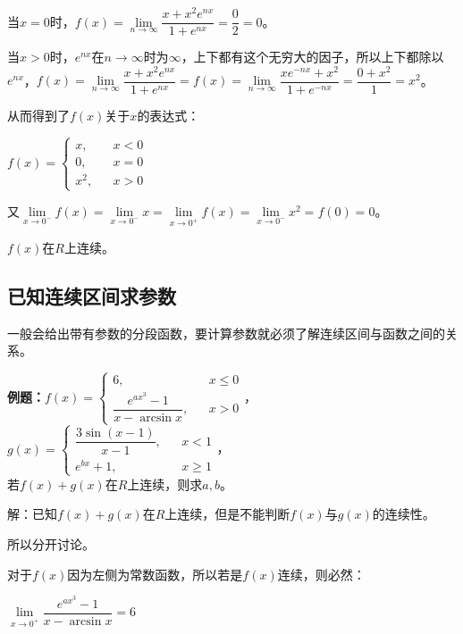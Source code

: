 当$x=0$时，$f(x)=\lim\limits_{n\to\infty}\dfrac{x+x^2e^{nx}}{1+e^{nx}}=\dfrac{0}{2}=0$。\medskip

当$x>0$时，$e^{nx}$在$n\to\infty$时为$\infty$，上下都有这个无穷大的因子，所以上下都除以$e^{nx}$，$f(x)=\lim\limits_{n\to\infty}\dfrac{x+x^2e^{nx}}{1+e^{nx}}=f(x)=\lim\limits_{n\to\infty}\dfrac{xe^{-nx}+x^2}{1+e^{-nx}}=\dfrac{0+x^2}{1}=x^2$。\medskip

从而得到了$f(x)$关于$x$的表达式：\medskip

$f(x)=\left\{\begin{array}{lcl}
                 x,   & & x<0 \\
                 0,   & & x=0 \\
                 x^2, & & x>0
\end{array}
\right.$\medskip

又$\lim\limits_{x\to 0^-}f(x)=\lim\limits_{x\to 0^-}x=\lim\limits_{x\to 0^+}f(x)=\lim\limits_{x\to 0^-}x^2=f(0)=0$。

$f(x)$在$R$上连续。

\subsection{已知连续区间求参数}

一般会给出带有参数的分段函数，要计算参数就必须了解连续区间与函数之间的关系。

\textbf{例题：}$f(x)=\left\{\begin{array}{lcl}
                             6,                               & & x\leqslant 0 \\
                             \dfrac{e^{ax^3}-1}{x-\arcsin x}, & & x>0
\end{array}
\right.$，$g(x)=\left\{\begin{array}{lcl}
                          \dfrac{3\sin(x-1)}{x-1}, & & x<1          \\
                          e^{bx}+1,                & & x\geqslant 1
\end{array}
\right.$，\smallskip \\ 若$f(x)+g(x)$在$R$上连续，则求$a,b$。

解：已知$f(x)+g(x)$在$R$上连续，但是不能判断$f(x)$与$g(x)$的连续性。

所以分开讨论。

对于$f(x)$因为左侧为常数函数，所以若是$f(x)$连续，则必然：\medskip

$\lim\limits_{x\to 0^+}\dfrac{e^{ax^3}-1}{x-\arcsin x}=6$\medskip

